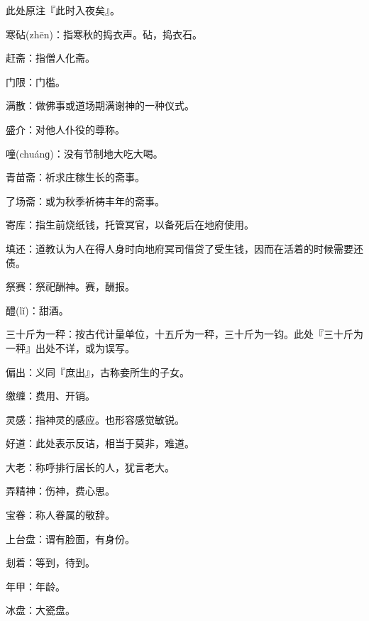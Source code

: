 \startbuffer[1508]
此处原注『此时入夜矣』。
\stopbuffer


\startbuffer[1509]
寒砧(zhēn)：指寒秋的捣衣声。砧，捣衣石。
\stopbuffer


\startbuffer[1510]
赶斋：指僧人化斋。
\stopbuffer


\startbuffer[1511]
门限：门槛。
\stopbuffer


\startbuffer[1512]
满散：做佛事或道场期满谢神的一种仪式。
\stopbuffer


\startbuffer[1513]
盛介：对他人仆役的尊称。
\stopbuffer


\startbuffer[1514]
噇(chuánɡ)：没有节制地大吃大喝。
\stopbuffer


\startbuffer[1515]
青苗斋：祈求庄稼生长的斋事。
\stopbuffer


\startbuffer[1516]
了场斋：或为秋季祈祷丰年的斋事。
\stopbuffer


\startbuffer[1517]
寄库：指生前烧纸钱，托管冥官，以备死后在地府使用。
\stopbuffer


\startbuffer[1518]
填还：道教认为人在得人身时向地府冥司借贷了受生钱，因而在活着的时候需要还债。
\stopbuffer


\startbuffer[1519]
祭赛：祭祀酬神。赛，酬报。
\stopbuffer


\startbuffer[1520]
醴(lǐ)：甜酒。
\stopbuffer


\startbuffer[1521]
三十斤为一秤：按古代计量单位，十五斤为一秤，三十斤为一钧。此处『三十斤为一秤』出处不详，或为误写。
\stopbuffer


\startbuffer[1522]
偏出：义同『庶出』，古称妾所生的子女。
\stopbuffer


\startbuffer[1523]
缴缠：费用、开销。
\stopbuffer


\startbuffer[1524]
灵感：指神灵的感应。也形容感觉敏锐。
\stopbuffer


\startbuffer[1525]
好道：此处表示反诘，相当于莫非，难道。
\stopbuffer


\startbuffer[1526]
大老：称呼排行居长的人，犹言老大。
\stopbuffer


\startbuffer[1527]
弄精神：伤神，费心思。
\stopbuffer


\startbuffer[1528]
宝眷：称人眷属的敬辞。
\stopbuffer


\startbuffer[1529]
上台盘：谓有脸面，有身份。
\stopbuffer


\startbuffer[1530]
刬着：等到，待到。
\stopbuffer


\startbuffer[1531]
年甲：年龄。
\stopbuffer


\startbuffer[1532]
冰盘：大瓷盘。
\stopbuffer


